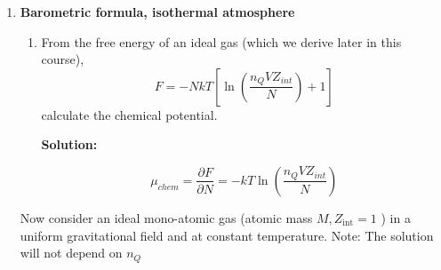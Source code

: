 \documentclass[10pt]{article}
\newenvironment{Solution}
    {\textbf{Solution:}
    
    \vspace{5mm}
    \begin{tcolorbox}
    }
    {
    \end{tcolorbox}
    \vspace{5mm}
    }
\begin{document}
\begin{enumerate}
\begin{enumerate}
\begin{Solution}
\begin{equation}
    \left.\frac{\partial p}{\partial V}\right|_{T_{crit}} = -\frac{RT}{\left(v-b\right)^2} + \frac{2a}{v^3} = 0
\end{equation}
\begin{equation}
    \left.\frac{\partial^2 p}{{\partial V}^2}\right|_{T_{crit}} = -\frac{2RT}{\left(v-b\right)^3} - \frac{6a}{v^4} = 0
\end{equation}
This leads to,
\begin{equation}
    a = \frac{9}{8}RT_{crit}v_{crit}, \qquad b = \frac{v_{crit}}{3}
\end{equation}
this lets us express the van der Waal equation as 
\begin{equation}
    \mathcal{V}^3-\frac{8}{3}\frac{\mathcal{T}\mathcal{V}^2}{\mathcal{P}} + \frac{\mathcal{V}^2}{3} + \frac{3\mathcal{V}}{P} - \frac{1}{\mathcal{P}} = 0
\end{equation}

\end{Solution}

    
\end{enumerate}

\newpage




\item \textbf{Barometric formula, isothermal atmosphere}

\begin{enumerate}

\item From the free energy of an ideal gas (which we derive later in this course),
$$
F=-N k T\left[\ln \left(\frac{n_{Q} V Z_{i n t}}{N}\right)+1\right]
$$
calculate the chemical potential.

\begin{Solution}
\begin{equation}
    \mu_{chem} = \frac{\partial F}{\partial N} = -k T\ln{\left(\frac{n_{Q} V Z_{i n t}}{N}\right)}
\end{equation}
\end{Solution}
\end{enumerate}
Now consider an ideal mono-atomic gas (atomic mass $M, Z_{\text {int}}=1$ ) in a uniform gravitational field and at constant temperature. Note: The solution will not depend on $n_{Q}$

\begin{enumerate}[resume]



\end{enumerate}
\end{enumerate}
\end{document}
